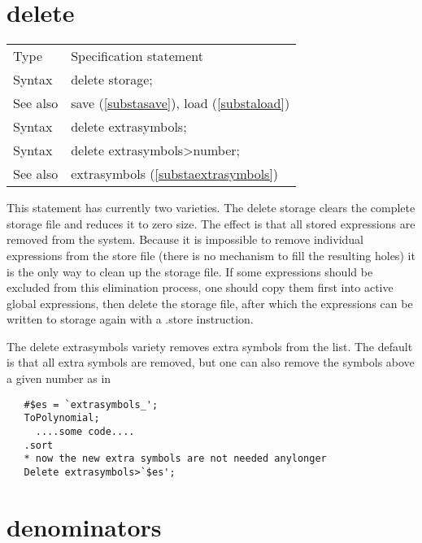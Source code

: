 
\section{delete}
\label{substadelete}

\noindent \begin{tabular}{ll}
Type & Specification statement\\
Syntax & delete storage; \\
See also & save (\ref{substasave}), load (\ref{substaload}) \\
Syntax & delete extrasymbols; \\
Syntax & delete extrasymbols\textgreater{}number; \\
See also & extrasymbols (\ref{substaextrasymbols}) \\

\end{tabular} \vspace{4mm}

\noindent This statement has currently two varieties. The delete 
storage clears the complete storage 
file and reduces it to zero size. The effect is that 
all stored expressions are removed from the system. Because it is 
impossible to remove individual expressions from the store file (there is 
no mechanism to fill the resulting holes) it is the only way to clean up 
the storage file. If some expressions should be excluded from this 
elimination process, one should copy them first into active global 
expressions, then delete the storage file, after which the expressions can 
be written to storage again with a .store instruction.

\noindent The delete extrasymbols\index{} variety removes 
extra symbols from the list. The default is that all 
extra symbols are removed, but one can also remove the symbols above a 
given number as in
\begin{verbatim}
   #$es = `extrasymbols_';
   ToPolynomial;
     ....some code....
   .sort
   * now the new extra symbols are not needed anylonger
   Delete extrasymbols>`$es';
\end{verbatim}
\vspace{10mm}


\section{denominators}
\label{substadenominators}

